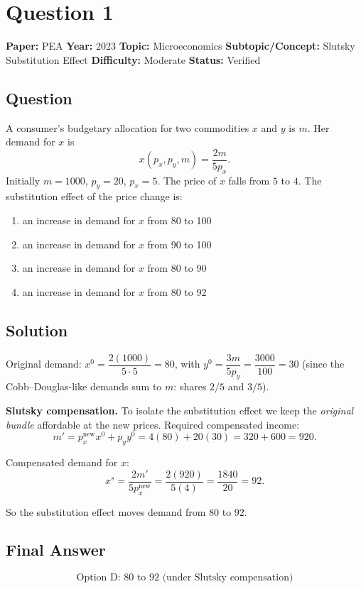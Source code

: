 \documentclass[11pt]{article}
\begin{document}
\section*{Question 1}
\textbf{Paper:} PEA \quad \textbf{Year:} 2023 \quad \textbf{Topic:} Microeconomics \quad \textbf{Subtopic/Concept:} Slutsky Substitution Effect \quad \textbf{Difficulty:} Moderate \quad \textbf{Status:} Verified

\subsection*{Question}
A consumer's budgetary allocation for two commodities $x$ and $y$ is $m$. Her demand for $x$ is
\[
x(p_x,p_y,m)=\frac{2m}{5p_x}.
\]
Initially $m=1000$, $p_y=20$, $p_x=5$. The price of $x$ falls from $5$ to $4$. The substitution effect of the price change is:
\begin{enumerate}[label=(\Alph*)]
\item an increase in demand for $x$ from 80 to 100
\item an increase in demand for $x$ from 90 to 100
\item an increase in demand for $x$ from 80 to 90
\item an increase in demand for $x$ from 80 to 92
\end{enumerate}

\subsection*{Solution}
Original demand: $x^0=\dfrac{2(1000)}{5\cdot 5}=80$, with $y^0=\dfrac{3m}{5p_y}=\dfrac{3000}{100}=30$
(since the Cobb--Douglas-like demands sum to $m$: shares $2/5$ and $3/5$).

\medskip\noindent\textbf{Slutsky compensation.} To isolate the substitution effect we keep the \emph{original bundle} affordable at the new prices. Required compensated income:
\[
m'=p_x^{\text{new}}x^0+p_y y^0=4(80)+20(30)=320+600=920.
\]

\noindent Compensated demand for $x$:
\[
x^{s}=\frac{2 m'}{5 p_x^{\text{new}}}=\frac{2(920)}{5(4)}=\frac{1840}{20}=92.
\]

So the substitution effect moves demand from $80$ to $92$.

\subsection*{Final Answer}
\[
\boxed{\text{Option D: 80 to 92 (under Slutsky compensation)}}
\]
\end{document}
